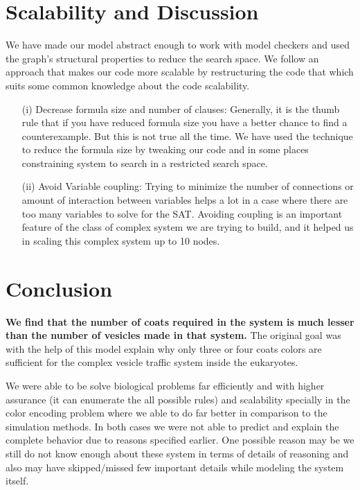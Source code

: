 \documentclass[preprint,12pt]{elsarticle}
\begin{document}
\section{Scalability and Discussion}
We have made our model abstract enough to work with model checkers and used the graph's structural properties to reduce the search space. We follow an approach that makes our code more scalable by restructuring the code that which suits some common knowledge about the code scalability.
\begin{enumerate}

\item[(i)] Decrease formula size and number of clauses: Generally, it is the thumb rule that if you have reduced formula size you have a better chance to find a counterexample. But this is not true all the time. We have used the technique to reduce the formula size by tweaking our code and in some places constraining system to search in a restricted search space. 

\item[(ii)] Avoid Variable coupling: Trying to minimize the number of connections or amount of interaction between variables helps a lot in a case where there are too many variables to solve for the SAT. Avoiding coupling is an important feature of the class of complex system we are trying to build, and it helped us in scaling this complex system up to 10 nodes.
\\ 
\end{enumerate}

\section{Conclusion}
\textbf{We find that the number of coats required in the system is much lesser than the number of vesicles made in that system.} The original goal was with the help of this model explain why only three or four coats colors are sufficient for the complex vesicle traffic system inside the eukaryotes. 

We were able to be solve biological problems far efficiently and with higher assurance (it can enumerate the all possible rules) and scalability specially in the color encoding problem where we able to do far better in comparison to the simulation methods. In both cases we were not able to predict and explain the complete behavior due to reasons specified earlier. One possible reason may be we still do not know enough about these system in terms of details of reasoning and also may have skipped/missed few important details while modeling the system itself. 
\end{document}

